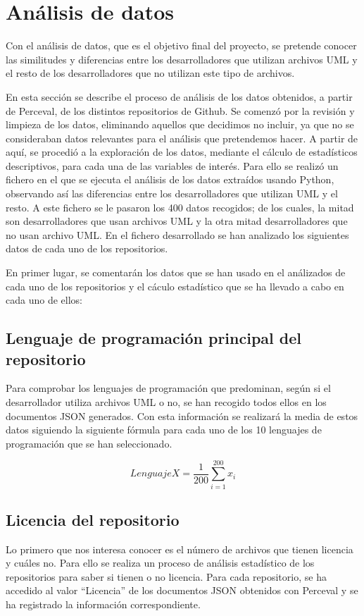 \documentclass[a4paper, 12pt]{book}
\begin{document}
\section{Análisis de datos} %
\label{sec:análisis de datos}

Con el análisis de datos, que es el objetivo final del proyecto, se pretende conocer las similitudes y diferencias entre los desarrolladores que utilizan archivos UML y el resto de los desarrolladores que no utilizan este tipo de archivos.


En esta sección se describe el proceso de análisis de los datos obtenidos, a partir de Perceval, de los distintos repositorios de Github. 
Se comenzó por la revisión y limpieza de los datos, eliminando aquellos que decidimos no incluir, ya que no se consideraban datos relevantes para el análisis que pretendemos hacer. 
A partir de aquí, se procedió a la exploración de los datos, mediante el cálculo de estadísticos descriptivos, para cada una de las variables de interés. 
Para ello se realizó un fichero en el que se ejecuta el análisis de los datos extraídos usando Python, observando así las diferencias entre los desarrolladores que utilizan UML y el resto.
A este fichero se le pasaron los 400 datos recogidos; de los cuales, la mitad son desarrolladores que usan archivos UML y la otra mitad desarrolladores que no usan archivo UML. 
En el fichero desarrollado se han analizado los siguientes datos de cada uno de los repositorios. 


En primer lugar, se comentarán los datos que se han usado en el análizados de cada uno de los repositorios y el cáculo estadístico que se ha llevado a cabo en cada uno de ellos:


\subsection{Lenguaje de programación principal del repositorio} %
\label{sec:lenguaje de programación principal del repositorio}
Para comprobar los lenguajes de programación que predominan, según si el desarrollador utiliza archivos UML o no, se han recogido todos ellos en los documentos JSON generados.
Con esta información se realizará la media de estos datos siguiendo la siguiente fórmula para cada uno de los 10 lenguajes de programación que se han seleccionado.


\[{Lenguaje X} = \frac{1}{200} \sum_{i=1}^{200} x_i\]


\subsection{Licencia del repositorio} %
\label{sec:licencia del repositorio}
Lo primero que nos interesa conocer es el número de archivos que tienen licencia y cuáles no.
Para ello se realiza un proceso de análisis estadístico de los repositorios para saber si tienen o no licencia.
Para cada repositorio, se ha accedido al valor ``Licencia'' de los documentos JSON obtenidos con Perceval y se ha registrado la información correspondiente.
\end{document}
